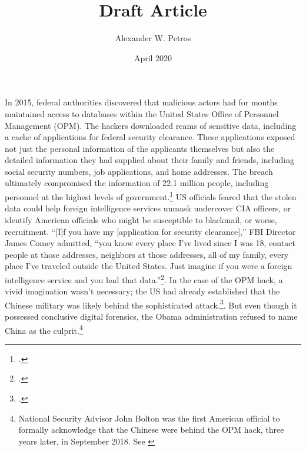\documentclass[14pt]{extarticle}
\title{Draft Article}
\author{Alexander W. Petros}
\date{April 2020}
\begin{document}
\maketitle

In 2015, federal authorities discovered that malicious actors had for months maintained access to databases within the United States Office of Personnel Management (OPM). The hackers downloaded reams of sensitive data, including a cache of applications for federal security clearance. These applications exposed not just the personal information of the applicants themselves but also the detailed information they had supplied about their family and friends, including social security numbers, job applications, and home addresses. The breach ultimately compromised the information of 22.1 million people, including personnel at the highest levels of government.\footcite{nakashima_hacks_2015} US officials feared that the stolen data could help foreign intelligence services unmask undercover CIA officers, or identify American officials who might be susceptible to blackmail, or worse, recruitment. \enquote{[I]f you have my [application for security clearance],} FBI Director James Comey admitted, ``you know every place I've lived since I was 18, contact people at those addresses, neighbors at those addresses, all of my family, every place I've traveled outside the United States. Just imagine if you were a foreign intelligence service and you had that data.''\footcite{nakashima_hacks_2015}. In the case of the OPM hack, a vivid imagination wasn't necessary; the US had already established that the Chinese military was likely behind the sophisticated attack.\footcite{koerner_inside_2016}. But even though it possessed conclusive digital forensics, the Obama administration refused to name China as the culprit.\footnote{National Security Advisor John Bolton was the first American official to formally acknowledge that the Chinese were behind the OPM hack, three years later, in September 2018. See \cite{sanger_trump_2018}}

\end{document}
